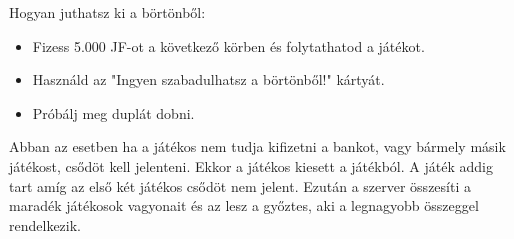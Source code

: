 Hogyan juthatsz ki a börtönből:

\begin{itemize}
\item Fizess 5.000 JF-ot a következő körben és folytathatod a játékot.
\item Használd az "Ingyen szabadulhatsz a börtönből!" kártyát.
\item Próbálj meg duplát dobni.
\end{itemize}


Abban az esetben ha a játékos nem tudja kifizetni a bankot, vagy bármely másik játékost, csődöt kell jelenteni. Ekkor a játékos kiesett a játékból. A játék addig tart amíg az első két játékos csődöt nem jelent. Ezután a szerver összesíti a maradék játékosok vagyonait és az lesz a győztes, aki a legnagyobb összeggel rendelkezik.

